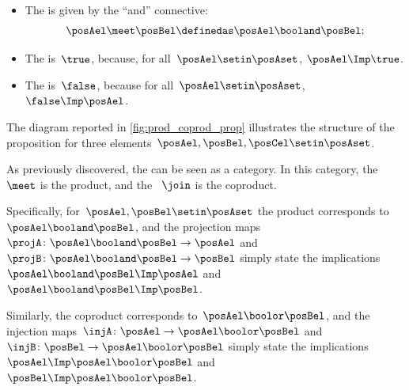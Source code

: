 \begin{ctdefinition}
\begin{itemize}
        \item The  is given by the ``and'' connective:
              \begin{equation}
                  \posAel \meet \posBel \definedas \posAel \booland \posBel;
              \end{equation}
        \item The  is~$\true$,
              because, for all~$\posAel\setin \posAset$, $\posAel \Imp \true$.
        \item The  is~$\false$, because for all~$\posAel\setin \posAset$, $\false \Imp \posAel$.
    \end{itemize}
\end{ctdefinition}
\begin{marginfigure}
    \centering
    \caption{}
    \label{fig:prod_coprod_prop}
\end{marginfigure}

The diagram reported in \cref{fig:prod_coprod_prop} illustrates the structure of the proposition  for three elements~$\posAel,\posBel,\posCel\setin \posAset$.

As previously discovered, the  can be seen as a category.
In this category, the ~$\meet$ is the product, and the ~$\join$ is the coproduct.

Specifically, for~$\posAel,\posBel\setin \posAset$ the product corresponds to~$\posAel\booland \posBel$, and the projection maps~$\projA\colon \posAel\booland \posBel\to \posAel$ and~$\projB\colon \posAel\booland \posBel\to \posBel$ simply state the implications~$\posAel \booland \posBel \Imp \posAel$ and~$\posAel \booland \posBel \Imp \posBel$.

Similarly, the coproduct corresponds to~$\posAel\boolor \posBel$, and the injection maps~$\injA\colon \posAel\to \posAel\boolor \posBel$ and~$\injB\colon \posBel\to \posAel\boolor \posBel$ simply state the implications~$\posAel \Imp \posAel \boolor \posBel$ and~$\posBel \Imp \posAel \boolor \posBel$.
